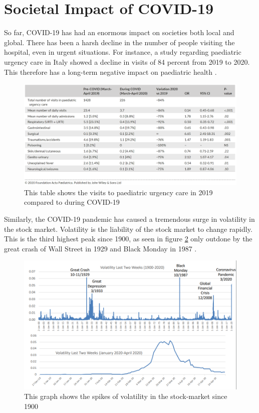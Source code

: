 \section{Societal Impact of COVID-19}

So far, COVID-19 has had an enormous impact on societies both local and global. There has been a harsh decline in the number of people visiting the hospital, even in urgent situations. For instance, a study regarding paediatric urgency care in Italy showed a decline in visits of 84 percent from 2019 to 2020. This therefore has a long-term negative impact on paediatric health \citep{manzoni_impact_nodate}.

\begin{figure}[H]
    \centering
    \includegraphics[width=\textwidth]{0_billeder/Covid impact hospitals.PNG}
    \caption{This table shows the visits to paediatric urgency care in 2019 compared to during COVID-19 \citep{manzoni_impact_nodate}}
    \label{fig:Covid-Hospital}
\end{figure}

Similarly, the COVID-19 pandemic has caused a tremendous surge in volatility in the stock market. Volatility is the liability of the stock market to change rapidly. This is the third highest peak since 1900, as seen in figure \ref{fig:Covid-Economy} only outdone by the great crash of Wall Street in 1929 and Black Monday in 1987 \citep{baker_unprecedented_2020}.

\begin{figure}[H]
    \centering
    \includegraphics[width=\textwidth]{0_billeder/Covid impact Economy.PNG}
    \caption{This graph shows the spikes of volatility in the stock-market since 1900 \citep{baker_unprecedented_2020}}
    \label{fig:Covid-Economy}
\end{figure}

